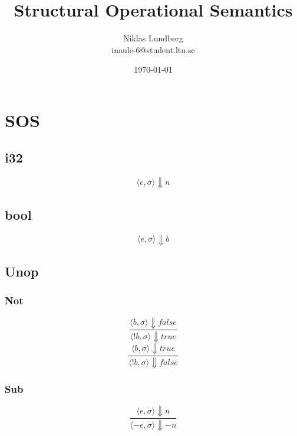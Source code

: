 \documentclass[12pt]{article}
\title{Structural Operational Semantics}
\author{Niklas Lundberg \\ inaule-6@student.ltu.se}
\date{\today}
\begin{document}
    \maketitle
    \newpage
    \section{SOS} 
        \subsection{i32}
                \begin{equation}
                    \langle e, \sigma \rangle\Downarrow n
                \end{equation}
                
            \subsection{bool}
                \begin{equation} 
                    \langle e, \sigma \rangle\Downarrow b
                \end{equation}   
                
            \subsection{Unop}
                \subsubsection{Not}
                    \begin{equation}  
                        \frac{\langle b, \sigma \rangle\Downarrow false}
                        {\langle !b, \sigma \rangle\Downarrow true }
                    \end{equation}
                    \begin{equation}
                        \frac{\langle b, \sigma \rangle\Downarrow true}
                        {\langle !b, \sigma \rangle\Downarrow false }
                    \end{equation}
                    
                \subsubsection{Sub}
                    \begin{equation}  
                        \frac{\langle e, \sigma \rangle\Downarrow n}
                        {\langle -e, \sigma \rangle\Downarrow - n }
                    \end{equation}
                    
\end{document}
